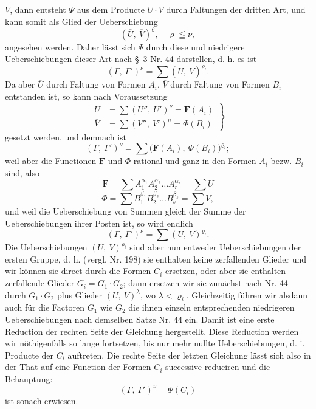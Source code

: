 \documentclass[11pt]{article}
\providecommand{\gesperrt}[1]{\textls[130]{#1}}
\providecommand{\weberpage}[1]{}
\providecommand{\weq}[2]{\begin{equation}\tag{#1}#2\end{equation}}
\let\Gamma\varGamma
\let\Phi\varPhi
\let\Psi\varPsi
\begin{document}
\weberpage{226}
$\overline V$, dann entsteht $\boldsymbol{\Psi}$ aus dem Producte $\overline U\cdot\overline V$
durch Faltungen der dritten Art, und kann somit als Glied der
Ueberschiebung
\[ (\overline U,\ \overline V)^\varrho,\quad \varrho \leqq \nu, \]
angesehen werden. Daher lässt sich $\boldsymbol{\Psi}$ durch diese und niedrigere
Ueberschiebungen dieser Art nach \S~3 Nr. 44 darstellen, d. h. es ist
\[ (\Gamma,\ \Gamma')^\nu = \sum (\overline U,\ \overline V)^{\varrho_i}. \]
Da aber $\overline U$ durch Faltung von Formen $A_i$, $\overline V$ durch Faltung
von Formen $B_i$ entstanden ist, so kann nach Voraussetzung
\weq{4}{ \left.\begin{aligned} \overline U &= \sum (U'',\ U')^\nu = \boldsymbol{F}(A_i) \\ \overline V &= \sum (V'',\ V')^\mu = \boldsymbol{\Phi}(B_i) \end{aligned}\right\} }
gesetzt werden, und demnach ist
\[ (\Gamma,\ \Gamma')^\nu = \sum \big(\boldsymbol{F}(A_i),\ \boldsymbol{\Phi}(B_i)\big)^{\varrho_i}; \]
weil aber die Functionen $\boldsymbol{F}$ und $\boldsymbol{\Phi}$ rational und ganz in den
Formen $A_i$ bezw. $B_i$ sind, also
\[ \boldsymbol{F} = \sum A_1^{\alpha_1} A_2^{\alpha_2} \ldots A_r^{\alpha_r} = \sum U \]
\[ \boldsymbol{\Phi} = \sum B_1^{\beta_1} B_2^{\beta_2} \ldots B_s^{\beta_s} = \sum V, \]
und weil die Ueberschiebung von Summen gleich der Summe der
Ueberschiebungen ihrer Posten ist, so wird endlich
\weq{5}{ (\Gamma,\ \Gamma')^\nu = \sum (U,\ V)^{\varrho_i}. }
Die Ueberschiebungen $(U,\ V)^{\varrho_i}$ sind aber nun entweder
Ueberschiebungen der ersten Gruppe, d. h. (vergl. Nr. 198) sie enthalten
keine zerfallenden Glieder und wir können sie direct durch die Formen
$C_i$ ersetzen, oder aber sie enthalten zerfallende Glieder
$G_i = G_1\cdot G_2$; dann ersetzen wir sie zunächst nach Nr. 44 durch
$G_1\cdot G_2$ plus Glieder \gesperrt{niedrigerer Ueberschiebungen}
$(U,\ V)^\lambda$, wo $\lambda < \varrho_i$. Gleichzeitig führen wir alsdann
auch für die Factoren $G_1$ wie $G_2$ die ihnen einzeln entsprechenden
niedrigeren Ueberschiebungen nach demselben Satze Nr. 44 ein. Damit
ist eine erste Reduction der rechten Seite der Gleichung hergestellt.
Diese Reduction werden wir nöthigenfalls so lange fortsetzen, bis nur
mehr nullte Ueberschiebungen, d. i. Producte der $C_i$ auftreten. Die
rechte Seite der letzten Gleichung lässt sich also in der That auf
eine Function der Formen $C_i$ successive reduciren und die
Behauptung:
\[ (\Gamma,\ \Gamma')^\nu = \boldsymbol{\Psi}(C_i) \]
ist sonach erwiesen.
\end{document}

